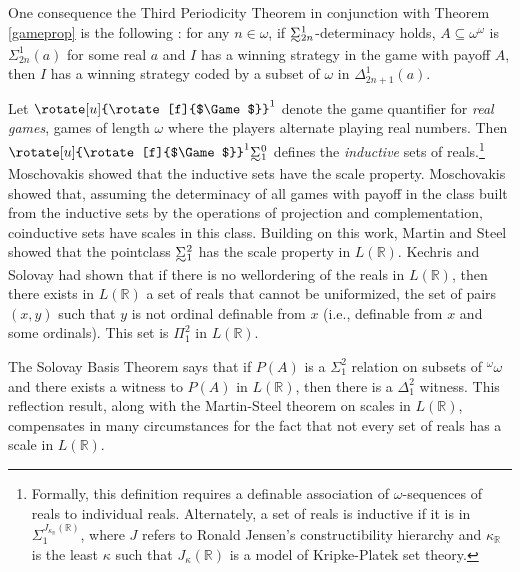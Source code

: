 \documentclass{book}%
\newcommand{\game}{\rotate[u]{\rotate[f]{$\Game$}}}
\newcommand{\breals}{{^{\omega}}\omega}
\def\underTilde#1{{\baselineskip=0pt\vtop{\hbox{$#1$}\hbox{$\sim$}}}{}}
\newcommand{\uTSigma}{\underTilde{\Sigma}}
\begin{document}
One consequence the Third Periodicity Theorem in conjunction with Theorem \ref{gameprop}
is the following \cite{Moschovakis:1973}: for
any $n \in \omega$, if $\uTSigma^{1}_{2n}$-determinacy
holds, $A \subseteq\omega^{\omega}$ is $\Sigma^{1}_{2n}(a)$ for some
real $a$ and $I$ has a winning strategy in the game with payoff $A$,
then $I$ has a winning strategy coded by a subset of $\omega$ in $\Delta^{1}_{2n+1}(a)$.




Let $\game^{1}$ denote the game quantifier for \emph{real games}, games of length
$\omega$ where the players alternate playing real numbers. Then $\game^{1}\uTSigma^{0}_{1}$ defines the
\emph{inductive} sets of reals.\footnote{Formally, this definition requires
a definable association of $\omega$-sequences of reals to individual reals. Alternately,
a set of reals is inductive if
it is in $\Sigma_{1}^{J_{\kappa_{\mathbb{R}}}(\mathbb{R})}$, where $J$
refers to Ronald Jensen's constructibility hierarchy and
$\kappa_{\mathbb{R}}$ is the least $\kappa$ such that
$J_{\kappa}(\mathbb{R})$ is a model of Kripke-Platek
set theory.}
Moschovakis  showed that the
inductive sets have the scale property. Moschovakis
 showed that, assuming the determinacy of all
games with payoff in the class built from the inductive sets by the
operations of projection and complementation, coinductive sets have
scales in this class. Building on this work, Martin and Steel
 showed that the pointclass $\uTSigma^{2}_{1}$ has the scale property in $L(\mathbb{R})$.
Kechris and Solovay had shown that if
there is no wellordering of the reals in $L(\mathbb{R})$, then there
exists in $L(\mathbb{R})$ a set of reals that cannot be uniformized,
the set of pairs $(x,y)$ such that $y$ is not ordinal definable from
$x$ (i.e., definable from $x$ and some ordinals). This set is
$\Pi^{2}_{1}$ in $L(\mathbb{R})$.

The Solovay Basis Theorem says that if $P(A)$ is a $\Sigma^{2}_{1}$
relation on subsets of $\breals$ and there exists a witness to
$P(A)$ in $L(\mathbb{R})$, then there is a $\Delta^{2}_{1}$ witness.
This reflection result, along with the Martin-Steel theorem on
scales in $L(\mathbb{R})$, compensates in many circumstances for the
fact that not every set of reals has a scale in $L(\mathbb{R})$.
\end{document}
